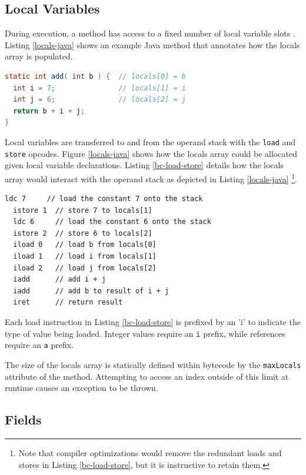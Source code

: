 \subsection{Local Variables}

During execution, a method has access to a fixed number of local variable slots \cite[2.6.1]{jvms7}.  Listing \ref{locals-java} shows an example Java method that annotates how the locals array is populated.

\begin{lstlisting}[language=Java,caption=Java local variables,label=locals-java]
static int add( int b ) {  // locals[0] = b
  int i = 7;               // locals[1] = i
  int j = 6;               // locals[2] = j
  return b + i + j;
}\end{lstlisting}

Local variables are transferred to and from the operand stack with the \texttt{load} and \texttt{store} opcodes.  Figure \ref{locals-java} shows how the locals array could be allocated given local variable declarations.  Listing \ref{bc-load-store} details how the locals array would interact with the operand stack as depicted in Listing \ref{locals-java} \footnote{Note that compiler optimizations would remove the redundant loads and stores in Listing \ref{bc-load-store}, but it is instructive to retain them.}.

\begin{lstlisting}[language=jvm-bytecode,caption=Load and store,label=bc-load-store]
  ldc 7     // load the constant 7 onto the stack
  istore 1  // store 7 to locals[1]
  ldc 6     // load the constant 6 onto the stack
  istore 2  // store 6 to locals[2]
  iload 0   // load b from locals[0]
  iload 1   // load i from locals[1]
  iload 2   // load j from locals[2]
  iadd      // add i + j
  iadd      // add b to result of i + j
  iret      // return result
\end{lstlisting}

Each load instruction in Listing \ref{bc-load-store} is prefixed by an 'i' to indicate the type of value being loaded.  Integer values require an \texttt{i} prefix, while references require an \texttt{a} prefix.  

The size of the locals array is statically defined within bytecode by the \texttt{maxLocals} attribute of the method.  Attempting to access an index outside of this limit at runtime causes an exception to be thrown.

\subsection{Fields}

